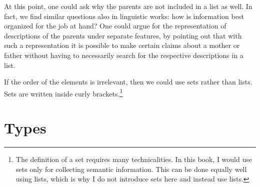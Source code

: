 \begin{figure}[tb]
\ea
{}
\z
\vspace{-\baselineskip}
\end{figure}%
At this point, one could ask why the parents are not included in a list as well. In fact, we find similar questions also
in linguistic works: how is information best organized for the job at hand? One could argue for the
representation of descriptions of the parents under separate features, by pointing out that with
such a representation it is possible to make certain claims about a mother or father without having to necessarily
search for the respective descriptions in a list.

If the order of the elements is irrelevant, then we could use sets rather than lists.
Sets are written inside curly brackets.\footnote{
The definition of a set requires many technicalities. 
In this book, I would use sets only for collecting semantic information. This can be done equally
well using lists, which is why I do not introduce sets here and instead use lists.%
}

\section{Types}
\label{sec-formalismus-typen}

